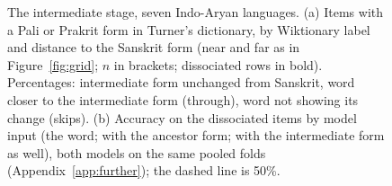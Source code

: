 \documentclass[11pt]{article}
\begin{document}
\begin{figure}[t]
\caption{The intermediate stage, seven Indo-Aryan languages. (a) Items with a Pali or Prakrit form in Turner's dictionary, by Wiktionary label and distance to the Sanskrit form (near and far as in Figure~\ref{fig:grid}; $n$ in brackets; dissociated rows in bold). Percentages: intermediate form unchanged from Sanskrit, word closer to the intermediate form (through), word not showing its change (skips). (b) Accuracy on the dissociated items by model input (the word; with the ancestor form; with the intermediate form as well), both models on the same pooled folds (Appendix~\ref{app:further}); the dashed line is 50\%.}
\label{tab:link}
\end{figure}
\end{document}
